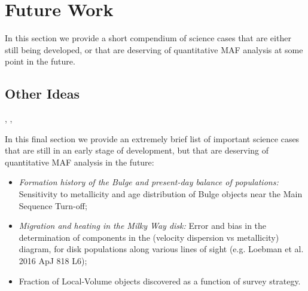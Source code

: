 %
%

\section{Future Work}
\def\secname{MW_future}\label{sec:\secname}

In this section we provide a short compendium of science cases that
are either still being developed, or that are deserving of quantitative
MAF analysis at some point in the future.








\subsection{Other Ideas}

, , 

In this final section we provide an extremely brief list of important science
cases that are still in an early stage of development, but that are
deserving of quantitative MAF analysis in the future:

\begin{itemize}
  \item {\it Formation history of the Bulge and present-day balance of
  populations:} Sensitivity to metallicity and age distribution of Bulge
  objects near the Main Sequence Turn-off;
  \item {\it Migration and heating in the Milky Way disk:} Error and
  bias in the determination of components in the (velocity dispersion vs
  metallicity) diagram, for disk populations along various lines of
  sight (e.g. Loebman et al. 2016 ApJ 818 L6);
  \item Fraction of Local-Volume objects discovered as a function of
  survey strategy.
\end{itemize}


\navigationbar
